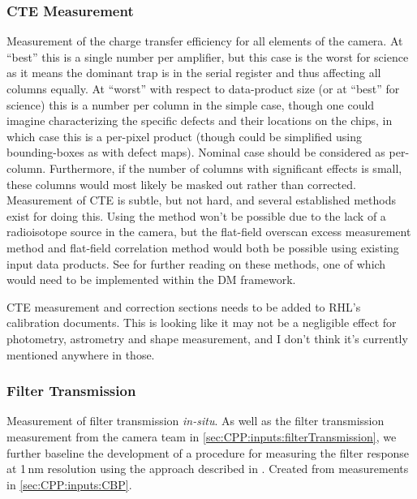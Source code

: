 \subsubsection{CTE Measurement}\label{sec:CPP:output:CTE}
Measurement of the charge transfer efficiency for all elements of the camera. At ``best'' this is a single number per amplifier, but this case is the worst for science as it means the dominant trap is in the serial register and thus affecting all columns equally. At ``worst'' with respect to data-product size (or at ``best'' for science) this is a number per column in the simple case, though one could imagine characterizing the specific defects and their locations on the chips, in which case this is a per-pixel product (though could be simplified using bounding-boxes as with defect maps). Nominal case should be considered as per-column. Furthermore, if the number of columns with significant effects is small, these columns would most likely be masked out rather than corrected.
\alg Measurement of CTE is subtle, but not hard, and several established methods exist for doing this. Using the \fefiftyfive method won't be possible due to the lack of a radioisotope source in the camera, but the flat-field overscan excess measurement method and flat-field correlation method would both be possible using existing input data products. See \XXX{} for further reading on these methods, one of which would need to be implemented within the DM framework.
\begin{note}
	CTE measurement and correction sections needs to be added to RHL's calibration documents. This is looking like it may not be a negligible effect for photometry, astrometry and shape measurement, and I don't think it's currently mentioned anywhere in those.
\end{note}


\subsubsection{Filter Transmission}\label{sec:CPP:output:filterTransmission}
Measurement of filter transmission \emph{in-situ}. As well as the filter transmission measurement from the camera team in \secsymbol\ref{sec:CPP:inputs:filterTransmission}, we further baseline the development of a procedure for measuring the filter response at 1\,nm resolution using the approach described in \cite{Lupton15}.
\alg Created from measurements in \secsymbol\ref{sec:CPP:inputs:CBP}. 


